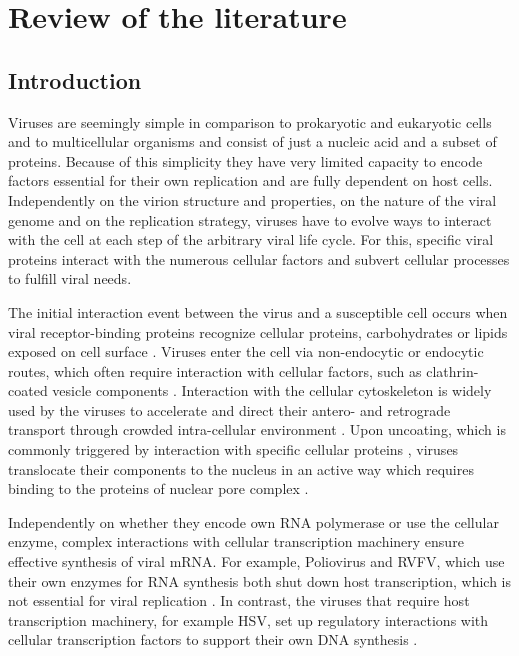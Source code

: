 \newpage
\setcounter{page}{1}
\doublespacing
\section{Review of the literature}

\subsection{Introduction}
	
	Viruses are seemingly simple in comparison to prokaryotic and eukaryotic cells and to multicellular organisms and consist of just a nucleic acid and a subset of proteins. Because of this simplicity they have very limited capacity to encode factors essential for their own replication and are fully dependent on host cells. Independently on the virion structure and properties, on the nature of the viral genome and on the replication strategy, viruses have to evolve ways to interact with the cell at each step of the arbitrary viral life cycle. For this, specific viral proteins interact with the numerous cellular factors and subvert cellular processes to fulfill viral needs.
			
	The initial interaction event between the virus and a susceptible cell occurs when viral receptor-binding proteins recognize cellular proteins, carbohydrates or lipids exposed on cell surface \parencite{Poranen2002}. Viruses enter the cell via non-endocytic or endocytic routes, which often require interaction with cellular factors, such as clathrin-coated vesicle components \parencite{Dimitrov2004}. Interaction with the cellular cytoskeleton is widely used by the viruses to accelerate and direct their antero- and retrograde transport through crowded intra-cellular environment \parencite{Ploubidou2001}. Upon uncoating, which is commonly triggered by interaction with specific cellular proteins \parencite{Suomalainen2013, Haywood2010}, viruses translocate their components to the nucleus in an active way which requires binding to the proteins of nuclear pore complex \parencite{Kobiler2012}.
				
	Independently on whether they encode own RNA polymerase or use the cellular enzyme, complex interactions with cellular transcription machinery ensure effective synthesis of viral mRNA. For example, Poliovirus and \gls{RVFV}, which use their own enzymes for RNA synthesis both shut down host transcription, which is not essential for viral replication \parencite{Kundu2005, LeMay2004}. In contrast, the viruses that require host transcription machinery, for example \gls{HSV}, set up regulatory interactions with cellular transcription factors to support their own DNA synthesis \parencite{Wysocka2003}.

